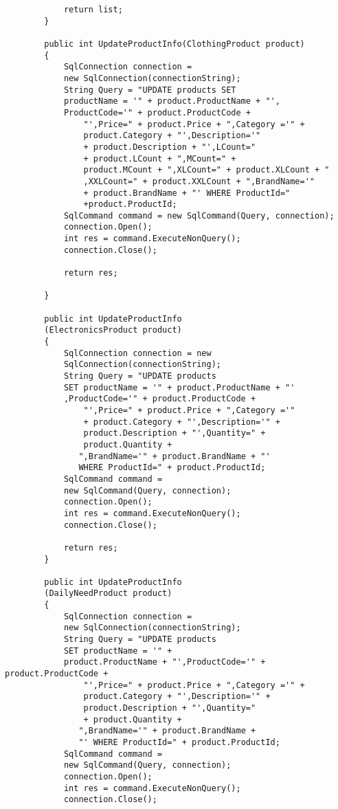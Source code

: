 \begin{lstlisting}
            return list;
        }

        public int UpdateProductInfo(ClothingProduct product)
        {
            SqlConnection connection = 
            new SqlConnection(connectionString);
            String Query = "UPDATE products SET 
            productName = '" + product.ProductName + "',
            ProductCode='" + product.ProductCode +
                "',Price=" + product.Price + ",Category ='" + 
                product.Category + "',Description='" 
                + product.Description + "',LCount=" 
                + product.LCount + ",MCount=" +
                product.MCount + ",XLCount=" + product.XLCount + "
                ,XXLCount=" + product.XXLCount + ",BrandName='" 
                + product.BrandName + "' WHERE ProductId="
                +product.ProductId;
            SqlCommand command = new SqlCommand(Query, connection);
            connection.Open();
            int res = command.ExecuteNonQuery();
            connection.Close();

            return res;

        }

        public int UpdateProductInfo
        (ElectronicsProduct product)
        {
            SqlConnection connection = new 
            SqlConnection(connectionString);
            String Query = "UPDATE products 
            SET productName = '" + product.ProductName + "'
            ,ProductCode='" + product.ProductCode +
                "',Price=" + product.Price + ",Category ='" 
                + product.Category + "',Description='" + 
                product.Description + "',Quantity=" +
                product.Quantity +
               ",BrandName='" + product.BrandName + "' 
               WHERE ProductId=" + product.ProductId;
            SqlCommand command = 
            new SqlCommand(Query, connection);
            connection.Open();
            int res = command.ExecuteNonQuery();
            connection.Close();

            return res;
        }

        public int UpdateProductInfo
        (DailyNeedProduct product)
        {
            SqlConnection connection = 
            new SqlConnection(connectionString);
            String Query = "UPDATE products 
            SET productName = '" + 
            product.ProductName + "',ProductCode='" + product.ProductCode +
                "',Price=" + product.Price + ",Category ='" + 
                product.Category + "',Description='" + 
                product.Description + "',Quantity=" 
                + product.Quantity +
               ",BrandName='" + product.BrandName + 
               "' WHERE ProductId=" + product.ProductId;
            SqlCommand command = 
            new SqlCommand(Query, connection);
            connection.Open();
            int res = command.ExecuteNonQuery();
            connection.Close();


\end{lstlisting}

